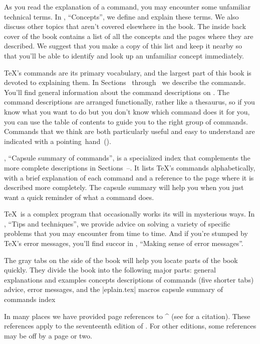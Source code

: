 As you read the explanation of a command, you may encounter
some unfamiliar technical terms.
In , ``Concepts'',
we define and explain these terms.
We also discuss other topics that aren't covered
elsewhere in the book.
The inside back cover of the book contains a list of all the
concepts and the pages where they are described.
We suggest that you make a copy of this list and keep it nearby
so that you'll be able to identify and look up an unfamiliar
concept immediately.

\TeX's commands are its primary vocabulary,
and the largest part of this book is
devoted to explaining them.  In Sections~
through~ we describe the commands.
You'll find general information about the command descriptions
on .
The command descriptions are arranged
functionally, rather like a thesaurus, so if you know what you want to
do but you don't know which command does it for you, you can use the
table of contents to guide you to the right group of commands.
Commands that we think are both particularly useful and easy to understand
are indicated with a pointing~hand~(\hand).

, ``Capsule summary of commands'', is a
specialized index that complements the more complete descriptions
in Sections~--.
It lists \TeX's commands 
alphabetically, with a brief explanation of each command
and a reference to the page
where it is described more completely.  The capsule summary
will help you when you just want a quick reminder of what a command
does.

\TeX\ is a complex program that occasionally works its will in
mysterious ways.
In , ``Tips and techniques'',
we provide advice on solving a variety of specific 
problems that you may encounter from time to time.
And if you're stumped by
\TeX's error messages, you'll find succor in ,
``Making sense of error messages''.

The gray tabs on the side of the book will help you locate parts of the
book quickly.  They divide the book into the following major parts:
\olist
\li general explanations and examples
\li concepts
\li descriptions of commands (five shorter tabs)
\li advice, error messages, and the |eplain.tex| macros
\li capsule summary of commands
\li index
\endolist

In many places we have provided page references to
^{\texbook} (see  for a citation).
These references apply to the seventeenth edition of \texbook.
For other editions, some references may be off by a page or two.


